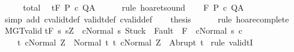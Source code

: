 \begin{isabellebody}
%
\isadelimproof
%
\endisadelimproof
%
\isatagproof
{}\isamarkupfalse%
\ {\isacharminus}\isanewline
\ \ \isamarkupfalse%
\ total\ \isamarkupfalse%
\ {\isachardoublequoteopen}{\isasymGamma}{\isacharcomma}{\isacharbraceleft}{\isacharbraceright}{\isasymTurnstile}\isactrlsub t\isactrlbsub {\isacharslash}F\isactrlesub \ P\ c\ Q{\isacharcomma}A{\isachardoublequoteclose}\isanewline
\ \ \ \ \isamarkupfalse%
\ {\isacharparenleft}rule\ hoaret{\isacharunderscore}sound{\isacharparenright}\isanewline
\ \ \isamarkupfalse%
\ {\isachardoublequoteopen}{\isasymGamma}{\isasymTurnstile}\isactrlbsub {\isacharslash}F\isactrlesub \ P\ c\ Q{\isacharcomma}A{\isachardoublequoteclose}\isanewline
\ \ \ \ \isamarkupfalse%
\ {\isacharparenleft}simp\ add{\isacharcolon}\ cvalidt{\isacharunderscore}def\ validt{\isacharunderscore}def\ cvalid{\isacharunderscore}def{\isacharparenright}\isanewline
\ \ \isamarkupfalse%
\ {\isacharquery}thesis\isanewline
\ \ \ \ \isamarkupfalse%
\ {\isacharparenleft}rule\ hoare{\isacharunderscore}complete{\isacharparenright}\isanewline
{}\isamarkupfalse%
%
\endisatagproof
{\isafoldproof}%
%
\isadelimproof
%
\endisadelimproof
%
\isamarkuptrue%
\isamarkupfalse%
\ MGT{\isacharunderscore}valid{\isacharcolon}\isanewline
{\isachardoublequoteopen}{\isasymGamma}{\isasymTurnstile}\isactrlsub t\isactrlbsub {\isacharslash}F\ \isactrlesub {\isacharbraceleft}s{\isachardot}\ s{\isacharequal}Z\ {\isasymand}\ {\isasymGamma}{\isasymturnstile}{\isasymlangle}c{\isacharcomma}Normal\ s{\isasymrangle}\ {\isasymRightarrow}{\isasymnotin}{\isacharparenleft}{\isacharbraceleft}Stuck{\isacharbraceright}\ {\isasymunion}\ Fault\ {\isacharbackquote}\ {\isacharparenleft}{\isacharminus}F{\isacharparenright}{\isacharparenright}\ {\isasymand}\ {\isasymGamma}{\isasymturnstile}c{\isasymdown}Normal\ s{\isacharbraceright}\ c\ \isanewline
\ \ \ \ {\isacharbraceleft}t{\isachardot}\ {\isasymGamma}{\isasymturnstile}{\isasymlangle}c{\isacharcomma}Normal\ Z{\isasymrangle}\ {\isasymRightarrow}\ Normal\ t{\isacharbraceright}{\isacharcomma}\ {\isacharbraceleft}t{\isachardot}\ {\isasymGamma}{\isasymturnstile}{\isasymlangle}c{\isacharcomma}Normal\ Z{\isasymrangle}\ {\isasymRightarrow}\ Abrupt\ t{\isacharbraceright}{\isachardoublequoteclose}\isanewline
%
\isadelimproof
%
\endisadelimproof
%
\isatagproof
{}\isamarkupfalse%
\ {\isacharparenleft}rule\ validtI{\isacharparenright}\ \isanewline
\ \ \isamarkupfalse%

\end{isabellebody}
